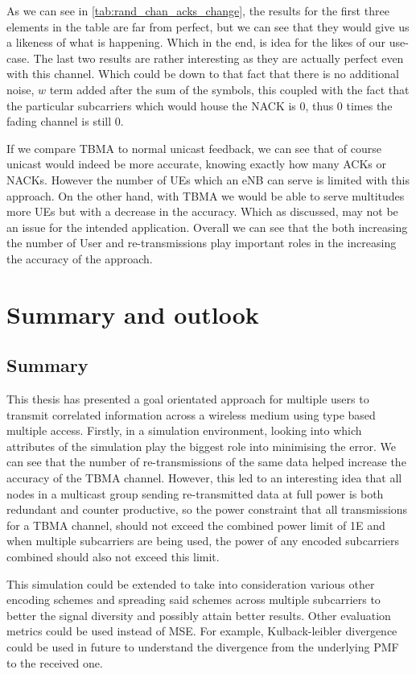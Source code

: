 \documentclass{article}
\begin{document}
As we can see in \cref{tab:rand_chan_acks_change}, the results for the first three elements in the table are far from perfect, but we can see that they would give us a likeness of what is happening. Which in the end, is idea for the likes of our use-case. The last two results are rather interesting as they are actually perfect even with this channel. Which could be down to that fact that there is no additional noise, $w$ term added after the sum of the symbols, this coupled with the fact that the particular subcarriers which would house the NACK is 0, thus 0 times the fading channel is still 0. 

If we compare \ac{TBMA} to normal unicast feedback, we can see that of course unicast would indeed be more accurate, knowing exactly how many ACKs or NACKs. However the number of UEs which an \ac{eNB} can serve is limited with this approach. On the other hand, with TBMA we would be able to serve multitudes more UEs but with a decrease in the accuracy. Which as discussed, may not be an issue for the intended application. Overall we can see that the both increasing the number of User and re-transmissions play important roles in the increasing the accuracy of the approach.


\section{Summary and outlook}\label{summary_out}
\subsection{Summary}
This thesis has presented a goal orientated approach for multiple users to transmit correlated information across a wireless medium using type based multiple access. Firstly, in a simulation environment, looking into which attributes of the simulation play the biggest role into minimising the error. We can see that the number of re-transmissions of the same data helped increase the accuracy of the TBMA channel. However, this led to an interesting idea that all nodes in a multicast group sending re-transmitted data at full power is both redundant and counter productive, so the power constraint that all transmissions for a TBMA channel, should not exceed the combined power limit of 1E and when multiple subcarriers are being used, the power of any encoded subcarriers combined should also not exceed this limit.

This simulation could be extended to take into consideration various other encoding schemes and spreading said schemes across multiple subcarriers to better the signal diversity and possibly attain better results. Other evaluation metrics could be used instead of MSE. For example, Kulback-leibler divergence could be used in future to understand the divergence from the underlying PMF to the received one.  
\end{document}
